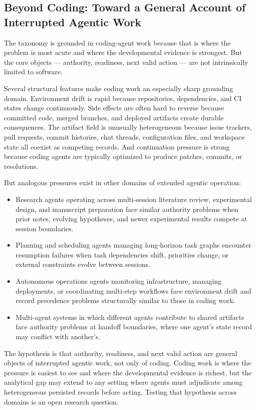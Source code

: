 \documentclass[a4paper,fleqn]{cas-dc}
\begin{document}
\subsection{Beyond Coding: Toward a General Account of Interrupted Agentic Work}

The taxonomy is grounded in coding-agent work because that is where the problem is most acute and where the developmental evidence is strongest. But the core objects --- authority, readiness, next valid action --- are not intrinsically limited to software.

Several structural features make coding work an especially sharp grounding domain. Environment drift is rapid because repositories, dependencies, and CI states change continuously. Side effects are often hard to reverse because committed code, merged branches, and deployed artifacts create durable consequences. The artifact field is unusually heterogeneous because issue trackers, pull requests, commit histories, chat threads, configuration files, and workspace state all coexist as competing records. And continuation pressure is strong because coding agents are typically optimized to produce patches, commits, or resolutions.

But analogous pressures exist in other domains of extended agentic operation:

\begin{itemize}
\item Research agents operating across multi-session literature review, experimental design, and manuscript preparation face similar authority problems when prior notes, evolving hypotheses, and newer experimental results compete at session boundaries.
\item Planning and scheduling agents managing long-horizon task graphs encounter resumption failures when task dependencies shift, priorities change, or external constraints evolve between sessions.
\item Autonomous operations agents monitoring infrastructure, managing deployments, or coordinating multi-step workflows face environment drift and record precedence problems structurally similar to those in coding work.
\item Multi-agent systems in which different agents contribute to shared artifacts face authority problems at handoff boundaries, where one agent's state record may conflict with another's.
\end{itemize}

The hypothesis is that authority, readiness, and next valid action are general objects of interrupted agentic work, not only of coding. Coding work is where the pressure is easiest to see and where the developmental evidence is richest, but the analytical gap may extend to any setting where agents must adjudicate among heterogeneous persisted records before acting. Testing that hypothesis across domains is an open research question.
\end{document}

